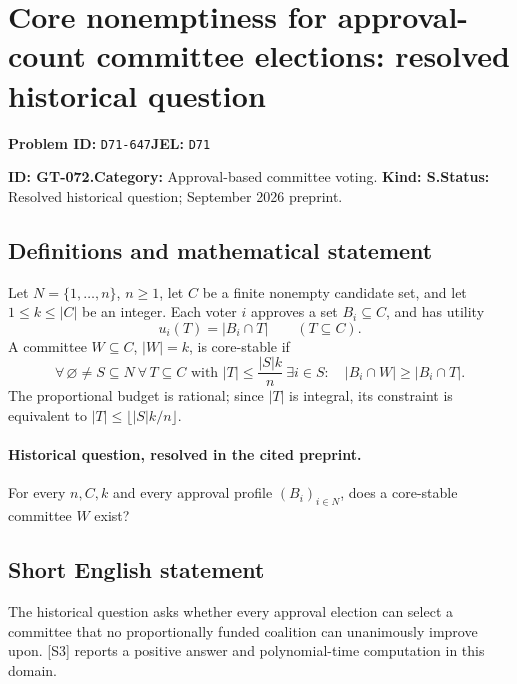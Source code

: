 \documentclass[11pt,a4paper]{article}
\begin{document}
\section*{Core nonemptiness for approval-count committee elections: resolved historical question}
\textbf{Problem ID:} \texttt{D71-647}\quad \textbf{JEL:} \texttt{D71}\par
\label{problem:OP-0202}
\label{audited:ECON-007}

\label{game:GT-072}
{\sffamily\small\color{muted}
\noindent\textbf{ID: GT-072.}\quad\textbf{Category:} Approval-based committee voting.
\quad\textbf{Kind: S.}\quad\textbf{Status:} Resolved historical question; September 2026 preprint.
\par}
\subsection*{Definitions and mathematical statement}
Let \(N=\{1,\ldots,n\}\), \(n\geq 1\), let \(C\) be a finite nonempty
candidate set, and let \(1\leq k\leq |C|\) be an integer.
Each voter \(i\) approves a set \(B_i\subseteq C\), and has utility
\[
 u_i(T)=|B_i\cap T|\qquad(T\subseteq C).
\]
A committee \(W\subseteq C\), \(|W|=k\), is core-stable if
\[
 \forall\,\varnothing\ne S\subseteq N\
 \forall\,T\subseteq C\text{ with }|T|\leq \frac{|S|k}{n}\
 \exists i\in S:\quad |B_i\cap W|\geq |B_i\cap T|.
\]
The proportional budget is rational; since \(|T|\) is integral, its
constraint is equivalent to \(|T|\leq\lfloor |S|k/n\rfloor\).

\paragraph{Historical question, resolved in the cited preprint.}
For every \(n,C,k\) and every approval profile \((B_i)_{i\in N}\),
does a core-stable committee \(W\) exist?

\subsection*{Short English statement}
The historical question asks whether every approval election can select a
committee that no proportionally funded coalition can unanimously improve upon.
[S3] reports a positive answer and polynomial-time computation in this domain.
\end{document}
